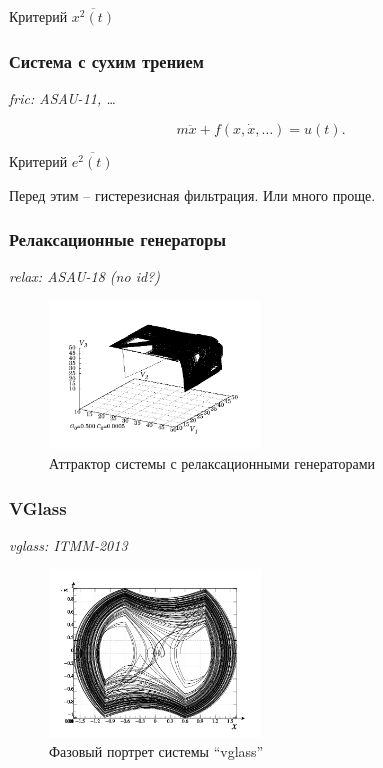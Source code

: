 \documentclass[a4paper,12pt]{article}
\newcommand{\LinkRef}[1]{ \textit{#1} }
\begin{document}
Критерий
$\overline{x^2(t)}$



\FloatBarrier
\subsubsection{Система с сухим трением}

\LinkRef{
  fric: ASAU-11, \ldots
}

\begin{equation}
 m \ddot{x} + f( x, \dot{x}, \ldots)  = u(t).
\label{atu:eq:dryfric_example}
\end{equation}

Критерий
$\overline{e^2(t)}$

Перед этим -- гистерезисная фильтрация.
Или много проще.



\FloatBarrier
\subsubsection{Релаксационные генераторы}


\LinkRef{
  relax: ASAU-18 (no id?)
}

\begin{figure}[htb!]
\centerline{\includegraphics[width=0.5\textwidth]{p/cha/relax_phase3_0500.pdf} }
\caption{Аттрактор системы с релаксационными генераторами}
\label{atu:f:relax_phase3}
\end{figure}



\FloatBarrier
\subsubsection{VGlass} %

\LinkRef{
  vglass: ITMM-2013
}

\begin{figure}[htb!]
\centerline{\includegraphics[width=0.5\textwidth]{p/cha/vg1-graph_phase.png} }
\caption{Фазовый портрет системы ``vglass'' }
\label{atu:f:vglass_phase}
\end{figure}
\end{document}
